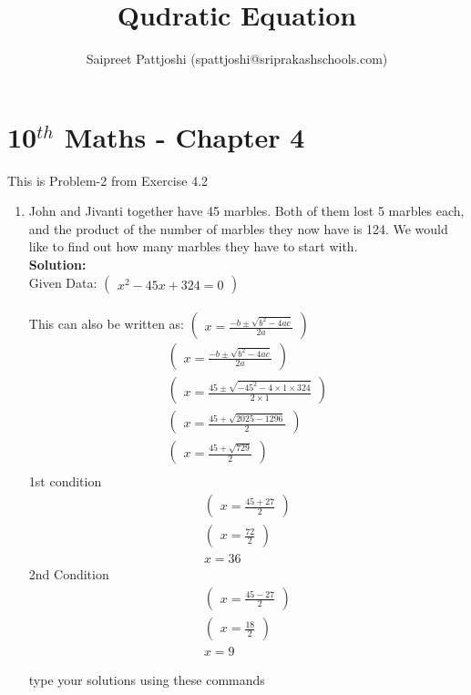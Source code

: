 \documentclass[12pt]{article}
\title{Qudratic Equation}
\author{Saipreet Pattjoshi (spattjoshi@sriprakashschools.com)}
\newcommand{\myvec}[1]{\ensuremath{\begin{pmatrix}#1\end{pmatrix}}}
\newcommand{\solution}{\noindent \textbf{Solution: }}
\begin{document}
\maketitle
\section*{10$^{th}$ Maths - Chapter 4}
This is Problem-2 from Exercise 4.2
\begin{enumerate}
\item John and Jivanti together have 45 marbles. Both of them lost 5 marbles each, and the product of the number of marbles they now have is 124. We would like to find out how many marbles they have to start with. \\
\solution \\
Given Data:
\myvec{x^2-45x+324=0}\\
\\This can also be written as:
\myvec{x=\frac{-b\pm\sqrt{b^2-4ac}}{2a}}\\
\begin{align}
\myvec{x=\frac{-b\pm\sqrt{b^2-4ac}}{2a}}\\
\myvec{x=\frac{45\pm\sqrt{-45^2-4 \times 1\times324}}{2 \times 1}}\\
\myvec{x=\frac{45+\sqrt{2025-1296}}{2}}\\
\myvec{x=\frac{45+\sqrt{729}}{2}}\\
\end{align}
1st condition
\begin{align}
\myvec{x=\frac{45+27}{2}}\\
\myvec{x=\frac{72}{2}}\\
x=36
\end{align}
2nd Condition
\begin{align}
\myvec{x=\frac{45-27}{2}}\\
\myvec{x=\frac{18}{2}}\\
x=9
\end{align}


type your solutions using these commands
	

\end{enumerate}
\end{document}

